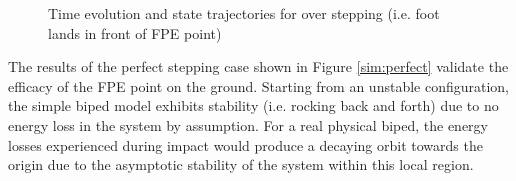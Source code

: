 \begin{figure}[!b]
	\begin{center}
	\end{center}
  	\caption{Time evolution and state trajectories for over stepping (i.e. foot lands in front of FPE point)}
	\label{sim:over}
\end{figure}

The results of the perfect stepping case shown in Figure \ref{sim:perfect} validate the efficacy of the FPE point on the ground. Starting from an unstable configuration, the simple biped model exhibits stability (i.e. rocking back and forth) due to no energy loss in the system by assumption. For a real physical biped, the energy losses experienced during impact would produce a decaying orbit towards the origin due to the asymptotic stability of the system within this local region. 

